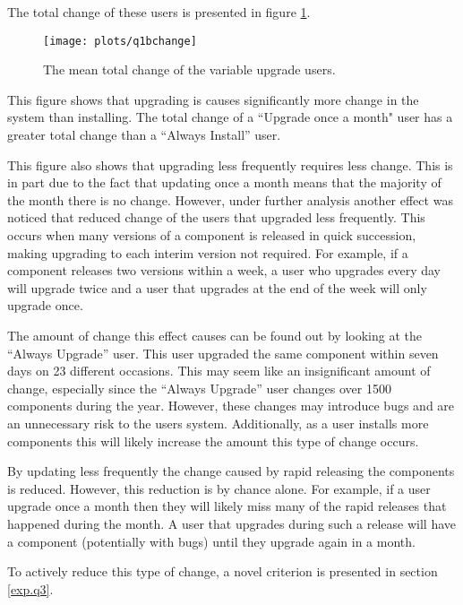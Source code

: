 The total change of these users is presented in figure \ref{exp.q1bchange}.
\begin{figure}[htp]
\begin{center}
  \texttt{[image: plots/q1bchange]}
  \caption{The mean total change of the variable upgrade users.}
  \label{exp.q1bchange}
\end{center}
\end{figure}
This figure shows that upgrading is causes significantly more change in the system than installing.
The total change of a ``Upgrade once a month" user has a greater total change than a ``Always Install'' user.

This figure also shows that upgrading less frequently requires less change. 
This is in part due to the fact that updating once a month means that the majority of the month there is no change.
However, under further analysis another effect was noticed that reduced change of the users that upgraded less frequently.
This occurs when many versions of a component is released in quick succession, making upgrading to each interim version not required.
For example, if a component releases two versions within a week, a user who upgrades every day will upgrade twice and a user that upgrades at the end of the week will only upgrade once.

The amount of change this effect causes can be found out by looking at the ``Always Upgrade'' user.
This user upgraded the same component within seven days on 23 different occasions.
This may seem like an insignificant amount of change, especially since the ``Always Upgrade'' user changes over 1500 components during the year.
However, these changes may introduce bugs and are an unnecessary risk to the users system.
Additionally, as a user installs more components this will likely increase the amount this type of change occurs.

By updating less frequently the change caused by rapid releasing the components is reduced.
However, this reduction is by chance alone.
For example, if a user upgrade once a month then they will likely miss many of the rapid releases that happened during the month.
A user that upgrades during such a release will have a component (potentially with bugs) until they upgrade again in a month.

To actively reduce this type of change, a novel criterion is presented in section \ref{exp.q3}.

